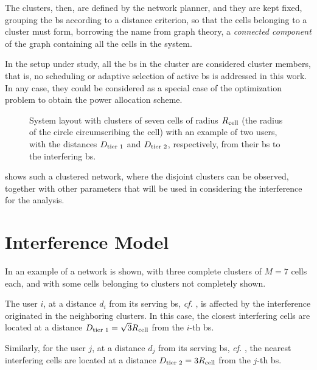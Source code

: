 The clusters, then, are defined by the network planner, and they are kept fixed,
grouping the \gls{bs} according to a distance criterion, so that the cells
belonging to a cluster must form, borrowing the name from graph theory, a
\emph{connected component} of the graph containing all the cells in the system.

In the setup under study, all the \gls{bs} in the cluster are considered cluster
members, that is, no scheduling or adaptive selection of active \gls{bs} is
addressed in this work. In any case, they could be considered as a special case
of the optimization problem to obtain the power allocation scheme.

\begin{figure}[t]
\begin{center}
    \dummybox
\end{center}
\caption{System layout with clusters of seven cells of radius $R_{\text{cell}}$ (the
radius of the circle circumscribing the cell) with an example of two users,
with the distances $D_{\text{tier 1}}$ and $D_{\text{tier 2}}$, respectively, from their \gls{bs} to
the interfering \gls{bs}.}
\label{fig:achiev_cluster_layout}
\end{figure}

 shows such a clustered network, where the
disjoint clusters can be observed, together with other parameters that will be
used in considering the interference for the analysis.

\section{Interference Model}\label{sec:achiev_interf}

In  an example of a network is shown, with three
complete clusters of $M=7$ cells each, and with some cells belonging to clusters
not completely shown.

The user $i$, at a distance $d_i$ from its serving \gls{bs}, \emph{cf.}
, is affected by the interference originated in the
neighboring clusters. In this case, the closest interfering cells are located at
a distance $D_{\text{tier 1}} = \sqrt{3} R_{\text{cell}}$ from the $i$-th \gls{bs}.

Similarly, for the user $j$, at a distance $d_j$ from its serving \gls{bs},
\emph{cf.} , the nearest interfering cells are located at
a distance $D_{\text{tier 2}} = 3R_{\text{cell}}$ from the $j$-th \gls{bs}.

